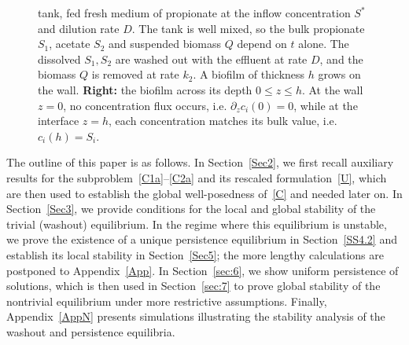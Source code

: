 \documentclass[reqno,11pt]{amsart}
\numberwithin{equation}{section}
\begin{document}
\begin{figure}[h]
{tank, fed fresh medium of propionate at the inflow concentration $S^*$ and dilution rate $D$. The tank is well
mixed, so the bulk propionate $S_1$, acetate $S_2$ and suspended biomass $Q$ depend on $t$ alone. The
dissolved $S_1,S_2$ are washed out with the effluent at rate $D$, and the biomass $Q$ is removed at rate $k_2$.
A biofilm of thickness $h$ grows on the wall. \textbf{Right:} the biofilm across its
depth $0\le z\le h$. At the wall $z=0$, no concentration flux occurs, i.e. $\partial_z c_i(0)=0$, while at the interface $z=h$, each concentration matches its bulk value, i.e. $c_i(h)=S_i$. %
}
\label{fig:reactor}
\end{figure}


The outline of this paper is as follows. In Section~\ref{Sec2}, we first recall auxiliary results for the subproblem~\eqref{C1a}–\eqref{C2a} and its rescaled formulation~\eqref{U}, which are then used to establish the global well-posedness of~\eqref{C} and needed later on. In Section~\ref{Sec3}, we provide conditions for the local and global stability of the trivial (washout) equilibrium. In the regime where this equilibrium is unstable, we prove the existence of a unique persistence equilibrium in Section~\ref{SS4.2} and establish its local stability in Section~\ref{Sec5}; the more lengthy calculations are postponed to Appendix~\ref{App}. In Section~\ref{sec:6}, we show uniform persistence of solutions, which is then used in Section~\ref{sec:7} to prove global stability of the nontrivial equilibrium under more restrictive assumptions.  Finally, Appendix~\ref{AppN} presents simulations illustrating the stability analysis of the washout and persistence equilibria.  \\
\end{document}
